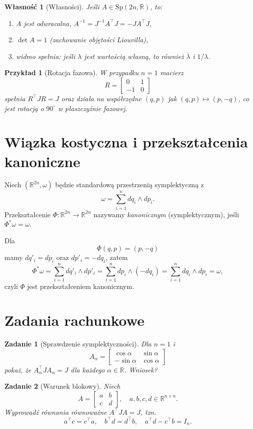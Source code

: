 \documentclass[12pt]{article}
\newtheorem{prop}{Własność}
\newtheorem{ex}{Przykład}
\newtheorem{exer}{Zadanie}
\newcommand{\R}{\mathbb{R}}
\newcommand{\Sp}{\mathrm{Sp}}
\begin{document}
\begin{prop}[Własności]
Jeśli $A\in\Sp(2n,\R)$, to:
\begin{enumerate}[label=(\alph*)]
    \item $A$ jest odwracalna, $A^{-1}=J^{-1}A^\top J = -J A^\top J$,
    \item $\det A=1$ (zachowanie objętości Liouvilla),
    \item widmo spełnia: jeśli $\lambda$ jest wartością własną, to również $\overline{\lambda}$ i $1/\lambda$.
\end{enumerate}
\end{prop}

\begin{ex}[Rotacja fazowa]
W przypadku $n=1$ macierz
\[
R=\begin{bmatrix}0&1\\ -1&0\end{bmatrix}
\]
spełnia $R^\top J R=J$ oraz działa na współrzędne $(q,p)$ jak $(q,p)\mapsto (p,-q)$, co jest rotacją o $90^\circ$ w płaszczyźnie fazowej.
\end{ex}

\section{Wiązka kostyczna i przekształcenia kanoniczne}
Niech $(\R^{2n},\omega)$ będzie standardową przestrzenią symplektyczną z
\[
\omega=\sum_{i=1}^n dq_i\wedge dp_i.
\]
Przekształcenie $\Phi:\R^{2n}\to\R^{2n}$ nazywamy \emph{kanonicznym} (symplektycznym), jeśli $\Phi^*\omega=\omega$.

Dla
\[
\Phi(q,p)=(p,-q)
\]
mamy $dq'_i=dp_i$ oraz $dp'_i=-dq_i$, zatem
\[
\Phi^*\omega = \sum_{i=1}^n dq'_i\wedge dp'_i
= \sum_{i=1}^n dp_i\wedge(-dq_i)
= \sum_{i=1}^n dq_i\wedge dp_i
= \omega,
\]
czyli $\Phi$ jest przekształceniem kanonicznym.

\section{Zadania rachunkowe}
\begin{exer}[Sprawdzenie symplektyczności]
Dla $n=1$ i
\[
A_\alpha=\begin{bmatrix}\cos\alpha&\sin\alpha\\ -\sin\alpha&\cos\alpha\end{bmatrix}
\]
pokaż, że $A_\alpha^\top J A_\alpha = J$ dla każdego $\alpha\in\R$. Wniosek?
\end{exer}

\begin{exer}[Warunek blokowy]
Niech 
\[
A=\begin{bmatrix} a& b\\ c& d\end{bmatrix},\quad a,b,c,d\in\R^{n\times n}.
\]
Wyprowadź równania równoważne $A^\top J A=J$, tzn.
\[
a^\top c=c^\top a,\quad b^\top d=d^\top b,\quad a^\top d-c^\top b=I_n.
\]
\end{exer}
\end{document}

